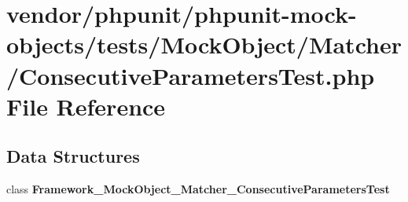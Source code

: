 \section{vendor/phpunit/phpunit-\/mock-\/objects/tests/\+Mock\+Object/\+Matcher/\+Consecutive\+Parameters\+Test.php File Reference}
\label{_consecutive_parameters_test_8php}
\subsection*{Data Structures}
\begin{DoxyCompactItemize}
\item 
class {\bf Framework\+\_\+\+Mock\+Object\+\_\+\+Matcher\+\_\+\+Consecutive\+Parameters\+Test}
\end{DoxyCompactItemize}
